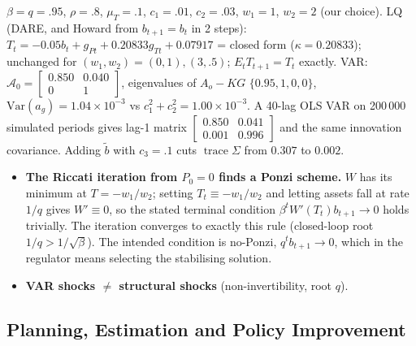 \documentclass[12pt, letterpaper]{article}
\newcommand{\tr}{\operatorname{trace}}
\begin{document}
\begin{tcolorbox}[evenbox,title={Exercise 5.8 \quad Tax smoothing and a VAR for $[g_t,T_t]$}]
\begin{tcolorbox}[databox]
$\beta=q=.95$, $\rho=.8$, $\mu_T=.1$, $c_1=.01$, $c_2=.03$, $w_1=1$, $w_2=2$ (our choice).
LQ (DARE, and Howard from $b_{t+1}=b_t$ in 2 steps): $T_t=-0.05b_t+g_{Pt}+0.20833g_{Tt}+0.07917$ =
closed form ($\kappa=0.20833$); unchanged for $(w_1,w_2)=(0,1),(3,.5)$; $E_tT_{t+1}=T_t$ exactly.
VAR: $\mathcal A_0=\begin{bmatrix}0.850&0.040\\0&1\end{bmatrix}$, eigenvalues of $A_o-KG$
$\{0.95,1,0,0\}$, $\mathrm{Var}(a_g)=1.04\times10^{-3}$ vs $c_1^2+c_2^2=1.00\times10^{-3}$. A 40-lag
OLS VAR on 200\,000 simulated periods gives lag-1 matrix $\begin{bmatrix}0.850&0.041\\0.001&0.996\end{bmatrix}$
and the same innovation covariance. Adding $\tilde b$ with $c_3=.1$ cuts $\tr\Sigma$ from $0.307$
to $0.002$.
\end{tcolorbox}

\begin{tcolorbox}[trapbox]
\begin{itemize}[itemsep=2pt]
\item \textbf{The Riccati iteration from $P_0=0$ finds a Ponzi scheme.} $W$ has its minimum at
$T=-w_1/w_2$; setting $T_t\equiv-w_1/w_2$ and letting assets fall at rate $1/q$ gives $W'\equiv0$, so the
stated terminal condition $\beta^tW'(T_t)b_{t+1}\to0$ holds trivially. The iteration converges to
exactly this rule (closed-loop root $1/q>1/\sqrt\beta$). The intended condition is no-Ponzi,
$q^tb_{t+1}\to0$, which in the regulator means selecting the stabilising solution.
\item \textbf{VAR shocks $\ne$ structural shocks} (non-invertibility, root $q$).
\end{itemize}
\end{tcolorbox}
\end{tcolorbox}

\subsection{Planning, Estimation and Policy Improvement}
\end{document}
